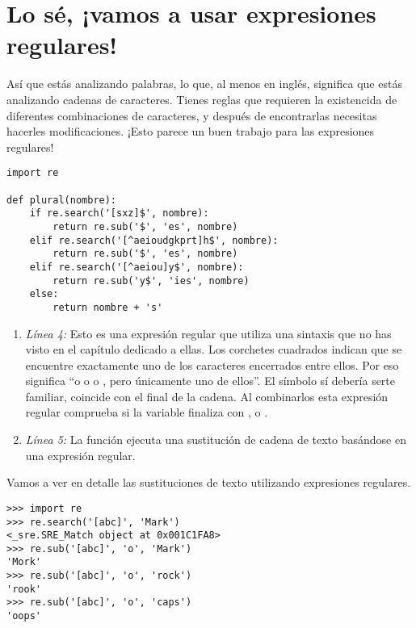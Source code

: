\section{Lo sé, ¡vamos a usar expresiones regulares!}

Así que estás analizando palabras, lo que, al menos en inglés, significa que estás analizando cadenas de caracteres. Tienes reglas que requieren la existencida de diferentes combinaciones de caracteres, y después de encontrarlas necesitas hacerles modificaciones. ¡Esto parece un buen trabajo para las expresiones regulares!

\noindent\begin{minipage}{\textwidth}
\begin{lstlisting}[mathescape=False]
import re

def plural(nombre):          
    if re.search('[sxz]$', nombre):
        return re.sub('$', 'es', nombre)
    elif re.search('[^aeioudgkprt]h$', nombre):
        return re.sub('$', 'es', nombre)       
    elif re.search('[^aeiou]y$', nombre):      
        return re.sub('y$', 'ies', nombre)     
    else:
        return nombre + 's'
\end{lstlisting}
\end{minipage}

\begin{enumerate}

\item \emph{Línea 4:} Esto es una expresión regular que utiliza una sintaxis que no has visto en el capítulo dedicado a ellas. Los corchetes cuadrados indican que se encuentre exactamente uno de los caracteres encerrados entre ellos. Por eso \codigo{[xyz]} significa ``o  o  o , pero únicamente uno de ellos''. El símbolo \codigo{\$} sí debería serte familiar, coincide con el final de la cadena. Al combinarlos esta expresión regular comprueba si la variable  finaliza con ,  o .

\item \emph{Línea 5:} La función  ejecuta una sustitución de cadena de texto basándose en una expresión regular.

\end{enumerate}

Vamos a ver en detalle las sustituciones de texto utilizando expresiones regulares.

\noindent\begin{minipage}{\textwidth}
\begin{lstlisting}[mathescape=False]
>>> import re
>>> re.search('[abc]', 'Mark')
<_sre.SRE_Match object at 0x001C1FA8>
>>> re.sub('[abc]', 'o', 'Mark')
'Mork'
>>> re.sub('[abc]', 'o', 'rock')
'rook'
>>> re.sub('[abc]', 'o', 'caps')
'oops'
\end{lstlisting}
\end{minipage}

